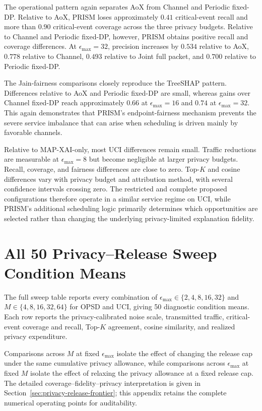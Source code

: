 \documentclass[11pt]{article}
\begin{document}
The operational pattern again separates AoX from Channel and Periodic fixed-DP. Relative to AoX, PRISM loses approximately $0.41$ critical-event recall and more than $0.90$ critical-event coverage across the three privacy budgets. Relative to Channel and Periodic fixed-DP, however, PRISM obtains positive recall and coverage differences. At $\epsilon_{\max}=32$, precision increases by $0.534$ relative to AoX, $0.778$ relative to Channel, $0.493$ relative to Joint full packet, and $0.700$ relative to Periodic fixed-DP.

The Jain-fairness comparisons closely reproduce the TreeSHAP pattern. Differences relative to AoX and Periodic fixed-DP are small, whereas gains over Channel fixed-DP reach approximately $0.66$ at $\epsilon_{\max}=16$ and $0.74$ at $\epsilon_{\max}=32$. This again demonstrates that PRISM's endpoint-fairness mechanism prevents the severe service imbalance that can arise when scheduling is driven mainly by favorable channels.

Relative to MAP-XAI-only, most UCI differences remain small. Traffic reductions are measurable at $\epsilon_{\max}=8$ but become negligible at larger privacy budgets. Recall, coverage, and fairness differences are close to zero. Top-$K$ and cosine differences vary with privacy budget and attribution method, with several confidence intervals crossing zero. The restricted and complete proposed configurations therefore operate in a similar service regime on UCI, while PRISM's additional scheduling logic primarily determines which opportunities are selected rather than changing the underlying privacy-limited explanation fidelity.



\clearpage
\section{All 50 Privacy--Release Sweep Condition Means}\label{app:sweep}

The full sweep table reports every combination of $\epsilon_{\max}\in\{2,4,8,16,32\}$ and $M\in\{4,8,16,32,64\}$ for OPSD and UCI, giving 50 diagnostic condition means. Each row reports the privacy-calibrated noise scale, transmitted traffic, critical-event coverage and recall, Top-$K$ agreement, cosine similarity, and realized privacy expenditure.

Comparisons across $M$ at fixed $\epsilon_{\max}$ isolate the effect of changing the release cap under the same cumulative privacy allowance, while comparisons across $\epsilon_{\max}$ at fixed $M$ isolate the effect of relaxing the privacy allowance at a fixed release cap. The detailed coverage--fidelity--privacy interpretation is given in Section~\ref{sec:privacy-release-frontier}; this appendix retains the complete numerical operating points for auditability.
\end{document}
